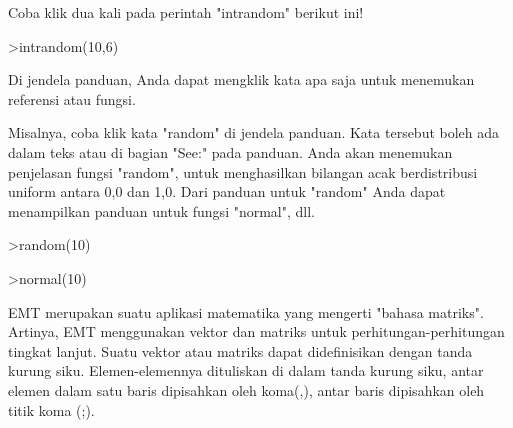 \documentclass[a4paper,10pt]{article}
\begin{document}
\begin{eulernotebook}
\begin{eulercomment}
\begin{eulercomment}
\begin{eulercomment}
Coba klik dua kali pada perintah "intrandom" berikut ini!
\end{eulercomment}
\begin{eulerprompt}
>intrandom(10,6)
\end{eulerprompt}
\begin{euleroutput}
  [3,  4,  4,  6,  2,  6,  1,  6,  1,  3]
\end{euleroutput}
\begin{eulercomment}
Di jendela panduan, Anda dapat mengklik kata apa saja untuk menemukan
referensi atau fungsi.

Misalnya, coba klik kata "random" di jendela panduan. Kata tersebut
boleh ada dalam teks atau di bagian "See:" pada panduan. Anda akan
menemukan penjelasan fungsi "random", untuk menghasilkan bilangan acak
berdistribusi uniform antara 0,0 dan 1,0. Dari panduan untuk "random"
Anda dapat menampilkan panduan untuk fungsi "normal", dll.
\end{eulercomment}
\begin{eulerprompt}
>random(10)
\end{eulerprompt}
\begin{euleroutput}
  [0.52143,  0.428893,  0.168134,  0.182742,  0.288048,  0.750042,
  0.472935,  0.324407,  0.340388,  0.195494]
\end{euleroutput}
\begin{eulerprompt}
>normal(10)
\end{eulerprompt}
\begin{euleroutput}
  [-0.277172,  -1.4568,  0.658046,  1.53204,  -2.47296,  -0.937381,
  0.836566,  -0.233827,  0.221796,  -0.541047]
\end{euleroutput}
\begin{eulercomment}
EMT merupakan suatu aplikasi matematika yang mengerti "bahasa matriks". Artinya,
EMT menggunakan vektor dan matriks untuk perhitungan-perhitungan tingkat lanjut.
Suatu vektor atau matriks dapat didefinisikan dengan tanda kurung siku.
Elemen-elemennya dituliskan di dalam tanda kurung siku, antar elemen dalam satu
baris dipisahkan oleh koma(,), antar baris dipisahkan oleh titik koma (;).


\end{eulercomment}
\end{eulercomment}
\end{eulercomment}
\end{eulernotebook}
\end{document}

